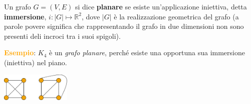 \begin{flushleft}
    Un grafo $G = (V, E)$ si dice \textbf{planare} se esiste un'applicazione iniettiva, detta \textbf{immersione}, $i: |G| \mapsto \mathbb{R}^2$, dove $|G|$ è la realizzazione geometrica del grafo (a parole povere significa che rappresentando il grafo in due dimensioni non sono presenti deli incroci tra i suoi spigoli).
    \begin{boxA}
        \textcolor{orange}{\textbf{Esempio}}: $K_4$ è un \textit{grafo planare}, perché esiste una opportuna sua immersione (iniettiva) nel piano.

        \begin{center}
            \centering
            \includegraphics[width=0.25\textwidth]{img/k4}
        \end{center}
    \end{boxA}
\end{flushleft}


